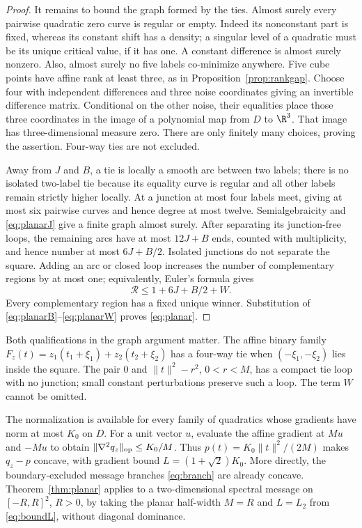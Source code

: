 \begin{proof}
It remains to bound the graph formed by the ties. Almost surely every
pairwise quadratic zero curve is regular or empty. Indeed its nonconstant
part is fixed, whereas its constant shift has a density; a singular level
of a quadratic must be its unique critical value, if it has one. A constant
difference is almost surely nonzero. Also, almost surely no five labels
co-minimize anywhere. Five cube points have affine rank at least three,
as in Proposition~\ref{prop:rankgap}. Choose four with independent
differences and three noise coordinates giving an invertible difference
matrix. Conditional on the other noise, their equalities place those three
coordinates in the image of a polynomial map from $D$ to $\R^3$. That
image has three-dimensional measure zero. There are only finitely many
choices, proving the assertion. Four-way ties are not excluded.

Away from $J$ and $B$, a tie is locally a smooth arc between two labels;
there is no isolated two-label tie because its equality curve is regular
and all other labels remain strictly higher locally. At a junction at most
four labels meet, giving at most six pairwise curves and hence degree at
most twelve. Semialgebraicity and \eqref{eq:planarJ} give a finite graph
almost surely. After separating its junction-free loops, the remaining
arcs have at most $12J+B$ ends, counted with multiplicity, and hence number
at most $6J+B/2$. Isolated junctions do not separate the square. Adding an
arc or closed loop increases the number of complementary regions by at most
one; equivalently, Euler's formula gives
\[
 \mathcal R\le1+6J+B/2+W.
\]
Every complementary region has a fixed unique winner. Substitution of
\eqref{eq:planarB}--\eqref{eq:planarW} proves \eqref{eq:planar}.
\end{proof}

Both qualifications in the graph argument matter. The affine binary family
$F_z(t)=z_1(t_1+\xi_1)+z_2(t_2+\xi_2)$ has a four-way tie when
$(-\xi_1,-\xi_2)$ lies inside the square. The pair $0$ and
$\|t\|^2-r^2$, $0<r<M$, has a compact tie loop with no junction;
small constant perturbations preserve such a loop. The term $W$ cannot
be omitted.

The normalization is available for every family of quadratics whose gradients
have norm at most $K_0$ on $D$. For a unit vector $u$, evaluate the affine
gradient at $Mu$ and $-Mu$ to obtain
$\|\nabla^2q_z\|_{\rm op}\le K_0/M$. Thus
$p(t)=K_0\|t\|^2/(2M)$ makes $q_z-p$ concave, with gradient bound
$L=(1+\sqrt2)K_0$. More directly, the boundary-excluded message branches
\eqref{eq:branch} are already concave. Theorem~\ref{thm:planar} applies
to a two-dimensional spectral message on $[-R,R]^2$, $R>0$, by taking
the planar half-width $M=R$ and $L=L_2$ from \eqref{eq:boundL}, without
diagonal dominance.


